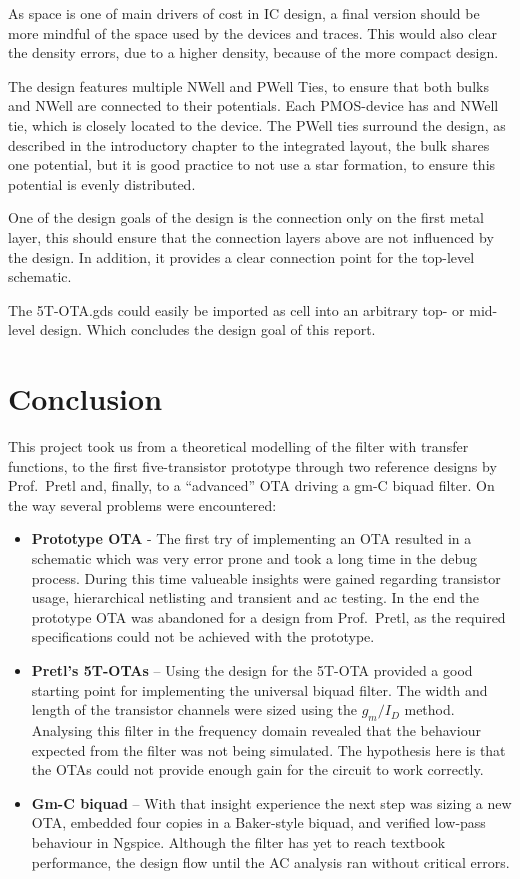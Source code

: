 \documentclass[
  letterpaper,
]{scrbook}
\begin{document}
As space is one of main drivers of cost in IC design, a final version
should be more mindful of the space used by the devices and traces. This
would also clear the density errors, due to a higher density, because of
the more compact design.

The design features multiple NWell and PWell Ties, to ensure that both
bulks and NWell are connected to their potentials. Each PMOS-device has
and NWell tie, which is closely located to the device. The PWell ties
surround the design, as described in the introductory chapter to the
integrated layout, the bulk shares one potential, but it is good
practice to not use a star formation, to ensure this potential is evenly
distributed.

One of the design goals of the design is the connection only on the
first metal layer, this should ensure that the connection layers above
are not influenced by the design. In addition, it provides a clear
connection point for the top-level schematic.

The 5T-OTA.gds could easily be imported as cell into an arbitrary top-
or mid-level design. Which concludes the design goal of this report.


\chapter{Conclusion}\label{conclusion}

This project took us from a theoretical modelling of the filter with
transfer functions, to the first five-transistor prototype through two
reference designs by Prof.~Pretl and, finally, to a ``advanced'' OTA
driving a gm-C biquad filter. On the way several problems were
encountered:

\begin{itemize}
\item
  \textbf{Prototype OTA} - The first try of implementing an OTA resulted
  in a schematic which was very error prone and took a long time in the
  debug process. During this time valueable insights were gained
  regarding transistor usage, hierarchical netlisting and transient and
  ac testing. In the end the prototype OTA was abandoned for a design
  from Prof.~Pretl, as the required specifications could not be achieved
  with the prototype.
\item
  \textbf{Pretl's 5T-OTAs} -- Using the design for the 5T-OTA provided a
  good starting point for implementing the universal biquad filter. The
  width and length of the transistor channels were sized using the
  \(g_m/I_D\) method. Analysing this filter in the frequency domain
  revealed that the behaviour expected from the filter was not being
  simulated. The hypothesis here is that the OTAs could not provide
  enough gain for the circuit to work correctly.
\item
  \textbf{Gm-C biquad} -- With that insight experience the next step was
  sizing a new OTA, embedded four copies in a Baker-style biquad, and
  verified low-pass behaviour in Ngspice. Although the filter has yet to
  reach textbook performance, the design flow until the AC analysis ran
  without critical errors.
\end{itemize}
\end{document}
